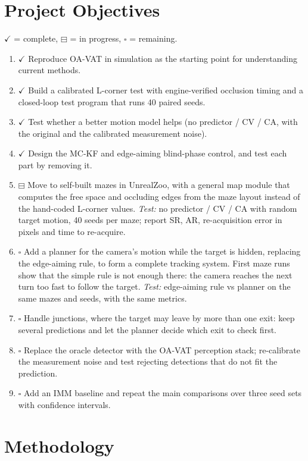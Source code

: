 \documentclass[12pt,a4paper]{article}
\begin{document}
\section{Project Objectives}
$\checkmark$ = complete, $\boxminus$ = in progress, $\square$ = remaining.

\begin{enumerate}
  \item $\checkmark$ Reproduce OA-VAT \cite{r3} in simulation as the starting point for understanding current methods.
  \item $\checkmark$ Build a calibrated L-corner test with engine-verified occlusion timing and a closed-loop test program that runs 40 paired seeds.
  \item $\checkmark$ Test whether a better motion model helps (no predictor / CV / CA, with the original and the calibrated measurement noise).
  \item $\checkmark$ Design the MC-KF and edge-aiming blind-phase control, and test each part by removing it.
  \item $\boxminus$ Move to self-built mazes in UnrealZoo, with a general map module that computes the free space and occluding edges from the maze layout instead of the hand-coded L-corner values. \emph{Test:} no predictor / CV / CA with random target motion, 40 seeds per maze; report SR, AR, re-acquisition error in pixels and time to re-acquire.
  \item $\square$ Add a planner for the camera's motion while the target is hidden, replacing the edge-aiming rule, to form a complete tracking system. First maze runs show that the simple rule is not enough there: the camera reaches the next turn too fast to follow the target. \emph{Test:} edge-aiming rule vs planner on the same mazes and seeds, with the same metrics.
  \item $\square$ Handle junctions, where the target may leave by more than one exit: keep several predictions and let the planner decide which exit to check first.
  \item $\square$ Replace the oracle detector with the OA-VAT perception stack; re-calibrate the measurement noise and test rejecting detections that do not fit the prediction.
  \item $\square$ Add an IMM baseline and repeat the main comparisons over three seed sets with confidence intervals.
\end{enumerate}
\section{Methodology}
\end{document}

